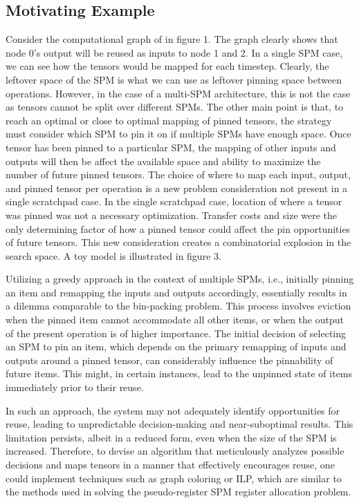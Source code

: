
\subsection{Motivating Example}


Consider the computational graph of in figure 1. The graph clearly shows that
node 0's output will be reused as inputs to node 1 and 2. In a single SPM case,
we can see how the tensors would be mapped for each timestep. Clearly, the
leftover space of the SPM is what we can use as leftover pinning space between
operations. However, in the case of a multi-SPM architecture, this is not the
case as tensors cannot be split over different SPMs. The other main point is
that, to reach an optimal or close to optimal mapping of pinned tensors, the
strategy must consider which SPM to pin it on if multiple SPMs have enough
space. Once tensor has been pinned to a particular SPM, the mapping of other
inputs and outputs will then be affect the available space and ability to
maximize the number of future pinned tensors. The choice of where to map each
input, output, and pinned tensor per operation is a new problem consideration
not present in a single scratchpad case. In the single scratchpad case,
location of where a tensor was pinned was not a necessary optimization. Transfer
costs and size were the only determining factor of how a pinned tensor could affect
the pin opportunities of future tensors. This new consideration creates a
combinatorial explosion in the search space. A toy model is illustrated in
figure 3.

Utilizing a greedy approach in the context of multiple SPMs, i.e., initially
pinning an item and remapping the inputs and outputs accordingly, essentially
results in a dilemma comparable to the bin-packing problem. This process
involves eviction when the pinned item cannot accommodate all other items, or
when the output of the present operation is of higher importance. The initial
decision of selecting an SPM to pin an item, which depends on the primary
remapping of inputs and outputs around a pinned tensor, can considerably
influence the pinnability of future items. This might, in certain instances,
lead to the unpinned state of items immediately prior to their reuse.

In such an approach, the system may not adequately identify opportunities for
reuse, leading to unpredictable decision-making and near-suboptimal results.
This limitation persists, albeit in a reduced form, even when the size of the
SPM is increased. Therefore, to devise an algorithm that meticulously analyzes
possible decisions and maps tensors in a manner that effectively encourages
reuse, one could implement techniques such as graph coloring or ILP, which are
similar to the methods used in solving the pseudo-register SPM register
allocation problem.

